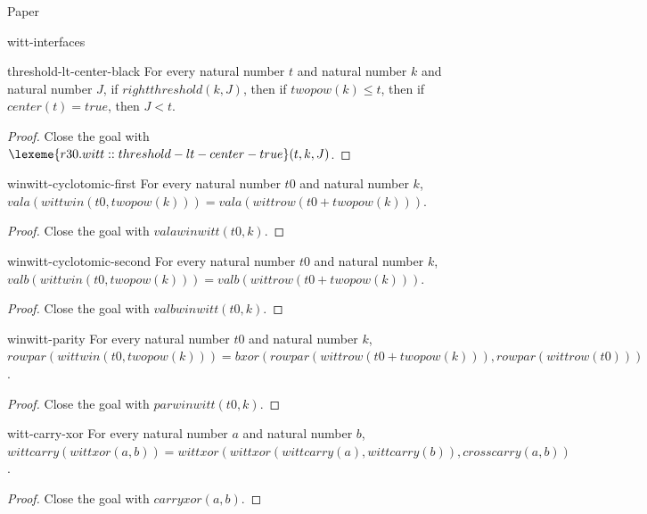 \begin{lexlean}{Paper}
\begin{section}{witt-interfaces}
  \begin{theorem}{threshold-lt-center-black}
  For every natural number \(t\) and natural number \(k\) and natural number \(J\), if \(rightthreshold(k, J)\), then if \(twopow(k) ≤ t\), then if \(center(t) = true\), then \(J < t\).
  \begin{proof}
  Close the goal with \(\lexeme{r30.witt::threshold-lt-center-true}(t, k, J)\).
  \end{proof}
  \end{theorem}

  \begin{theorem}{winwitt-cyclotomic-first}
  For every natural number \(t0\) and natural number \(k\), \(vala(wittwin(t0, twopow(k))) = vala(wittrow(t0 + twopow(k)))\).
  \begin{proof}
  Close the goal with \(valawinwitt(t0, k)\).
  \end{proof}
  \end{theorem}

  \begin{theorem}{winwitt-cyclotomic-second}
  For every natural number \(t0\) and natural number \(k\), \(valb(wittwin(t0, twopow(k))) = valb(wittrow(t0 + twopow(k)))\).
  \begin{proof}
  Close the goal with \(valbwinwitt(t0, k)\).
  \end{proof}
  \end{theorem}

  \begin{theorem}{winwitt-parity}
  For every natural number \(t0\) and natural number \(k\), \(rowpar(wittwin(t0, twopow(k))) = bxor(rowpar(wittrow(t0 + twopow(k))), rowpar(wittrow(t0)))\).
  \begin{proof}
  Close the goal with \(parwinwitt(t0, k)\).
  \end{proof}
  \end{theorem}

  \begin{theorem}{witt-carry-xor}
  For every natural number \(a\) and natural number \(b\), \(wittcarry(wittxor(a, b)) = wittxor(wittxor(wittcarry(a), wittcarry(b)), crosscarry(a, b))\).
  \begin{proof}
  Close the goal with \(carryxor(a, b)\).
  \end{proof}
  \end{theorem}


\end{section}
\end{lexlean}

